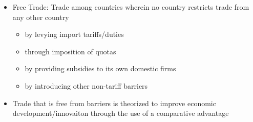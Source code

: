 \documentclass[11pt]{article}
\begin{document}
\begin{itemize}
\begin{itemize}
\item Free Trade: Trade among countries wherein no country restricts trade from any other country
\begin{itemize}
\item by levying import tariffs/duties
\item through imposition of quotas
\item by providing subsidies to its own domestic firms
\item by introducing other non-tariff barriers
\end{itemize}
\item Trade that is free from barriers is theorized to improve economic development/innovaiton
through the use of a comparative advantage
\end{itemize}
\end{itemize}
\end{document}
